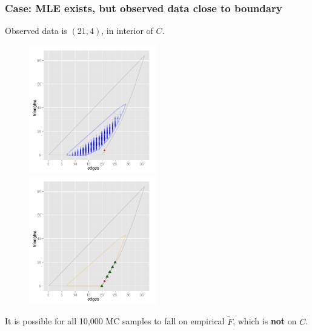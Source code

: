 \documentclass[ 10pt]{beamer}
\begin{document}
%
\frame
{
\frametitle{Case: MLE exists, but observed data close to boundary}  
Observed data is $(21,4)$, in interior of $C$.
\begin{figure}[h]
\centering
\includegraphics[height=2.2in]{MCsample-problem}
\includegraphics[height=2.2in]{MCsample-fakeface}
\end{figure}
It is possible for all 10,000 MC samples to fall on empirical $\tilde{F}$, which is \textbf{not} on
$C$.
}
%
%
%
\frame
\end{document}
